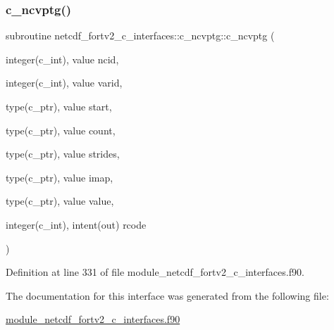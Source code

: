 \subsubsection{\texorpdfstring{c\+\_\+ncvptg()}{c\_ncvptg()}}
{\footnotesize\ttfamily subroutine netcdf\+\_\+fortv2\+\_\+c\+\_\+interfaces\+::c\+\_\+ncvptg\+::c\+\_\+ncvptg (\begin{DoxyParamCaption}\item[{integer(c\+\_\+int), value}]{ncid,  }\item[{integer(c\+\_\+int), value}]{varid,  }\item[{type(c\+\_\+ptr), value}]{start,  }\item[{type(c\+\_\+ptr), value}]{count,  }\item[{type(c\+\_\+ptr), value}]{strides,  }\item[{type(c\+\_\+ptr), value}]{imap,  }\item[{type(c\+\_\+ptr), value}]{value,  }\item[{integer(c\+\_\+int), intent(out)}]{rcode }\end{DoxyParamCaption})}



Definition at line 331 of file module\+\_\+netcdf\+\_\+fortv2\+\_\+c\+\_\+interfaces.\+f90.



The documentation for this interface was generated from the following file\+:\begin{DoxyCompactItemize}
\item 
\hyperlink{module__netcdf__fortv2__c__interfaces_8f90}{module\+\_\+netcdf\+\_\+fortv2\+\_\+c\+\_\+interfaces.\+f90}\end{DoxyCompactItemize}
